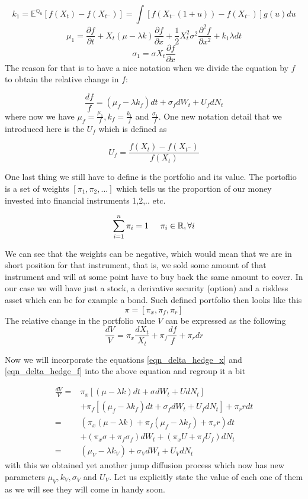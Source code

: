 \documentclass[times, utf8, diplomski]{fer}
\begin{document}
$$ k_1 = \mathbb{E}^{\mathbb{Q}_u}[f(X_t) - f(X_{t^-})] = \int[f(X_{t^-}(1 + u)) - f(X_{t^-})]g(u)du $$
$$ \mu_1 = \frac{\partial f}{\partial t} + X_t(\mu - \lambda k)\frac{\partial f}{\partial x} + \frac{1}{2}X_t^2\sigma^2\frac{\partial^2 f}{\partial x^2} + k_1 \lambda dt $$
$$ \sigma_1 = \sigma X_t\frac{\partial f}{\partial x} $$
The reason for that is to have a nice notation when we divide the equation by $f$ to obtain the relative change in $f$:

\begin{equation} \label{eqn_delta_hedge_f}
	\frac{df}{f} = (\mu_f - \lambda k_f)dt + \sigma_f dW_t + U_fdN_t
\end{equation} where now we have $\mu_f = \frac{\mu_1}{f}, k_f = \frac{k_1}{f}$ and $\frac{\sigma_1}{f}$. One new notation detail that we introduced here is the $U_f$ which is defined as

\begin{equation}
	U_f = \frac{f(X_t) - f(X_{t^-})}{f(X_t)}
\end{equation}

\noindent One last thing we still have to define is the portfolio and its value. The portoflio is a set of weights $[\pi_1, \pi_2, ...]$ which tells us the proportion of our money invested into financial instruments 1,2,.. etc. 

$$ \sum_{i=1}^{n} \pi_i = 1 \hspace{0.5cm} \pi_i \in \mathbb{R},\forall i $$

\noindent We can see that the weights can be negative, which would mean that we are in short position for that instrument, that is, we sold some amount of that instrument and will at some point have to buy back the same amount to cover. In our case we will have just a stock, a derivative security (option) and a riskless asset which can be for example a bond. Such defined portfolio then looks like this 
$$ \pi = [\pi_x, \pi_f, \pi_r] $$
The relative change in the portfolio value $V$ can be expressed as the following
\begin{equation}\label{eqn_delta_hedge_v}
	\frac{dV}{V} = \pi_x\frac{dX_t}{X_t} + \pi_f\frac{df}{f} + \pi_r dr
\end{equation}

\noindent Now we will incorporate the equations \ref{eqn_delta_hedge_x} and \ref{eqn_delta_hedge_f} into the above equation and regroup it a bit

\begin{align*}
	\frac{dV}{V} =& \pi_x [(\mu - \lambda k)dt + \sigma dW_t + UdN_t] \\&+\pi_f [(\mu_f - \lambda k_f)dt + \sigma_f dW_t + U_fdN_t] +\pi_r r dt \\
				 =& (\pi_x(\mu-\lambda k) + \pi_f (\mu_f - \lambda k_f) + \pi_r r) dt \\&+ (\pi_x\sigma + \pi_f\sigma_f)dW_t + (\pi_x U + \pi_f U_f)dN_t \\
				 =& (\mu_V - \lambda k_V) + \sigma_V dW_t + U_V dN_t
\end{align*} with this we obtained yet another jump diffusion process which now has new parameters $\mu_V, k_V, \sigma_V$ and $U_V$. Let us explicitly state the value of each one of them as we will see they will come in handy soon.
\end{document}
